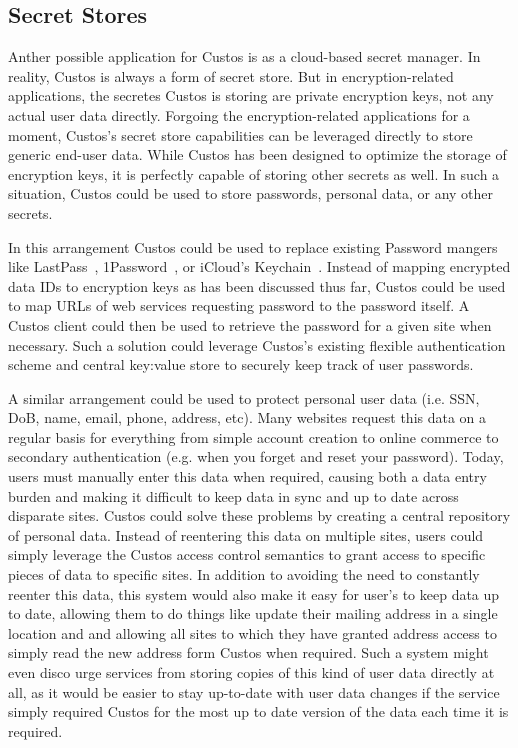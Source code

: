 \subsection{Secret Stores}

Anther possible application for Custos is as a cloud-based secret
manager. In reality, Custos is always a form of secret store. But in
encryption-related applications, the secretes Custos is storing are
private encryption keys, not any actual user data directly. Forgoing
the encryption-related applications for a moment, Custos's secret
store capabilities can be leveraged directly to store generic end-user
data. While Custos has been designed to optimize the storage of
encryption keys, it is perfectly capable of storing other secrets as
well. In such a situation, Custos could be used to store passwords,
personal data, or any other secrets.

In this arrangement Custos could be used to replace existing Password
mangers like LastPass~\cite{lastpass}, 1Password~\cite{onepassword},
or iCloud's Keychain~\cite{icloud}. Instead of mapping encrypted data
IDs to encryption keys as has been discussed thus far, Custos could be
used to map URLs of web services requesting password to the password
itself. A Custos client could then be used to retrieve the password
for a given site when necessary. Such a solution could leverage
Custos's existing flexible authentication scheme and central key:value
store to securely keep track of user passwords.

A similar arrangement could be used to protect personal user data
(i.e. SSN, DoB, name, email, phone, address, etc). Many websites
request this data on a regular basis for everything from simple
account creation to online commerce to secondary authentication
(e.g. when you forget and reset your password). Today, users must
manually enter this data when required, causing both a data entry
burden and making it difficult to keep data in sync and up to date
across disparate sites. Custos could solve these problems by creating
a central repository of personal data. Instead of reentering this data
on multiple sites, users could simply leverage the Custos access
control semantics to grant access to specific pieces of data to
specific sites. In addition to avoiding the need to constantly reenter
this data, this system would also make it easy for user's to keep data
up to date, allowing them to do things like update their mailing
address in a single location and and allowing all sites to which they
have granted address access to simply read the new address form Custos
when required. Such a system might even disco urge services from
storing copies of this kind of user data directly at all, as it would
be easier to stay up-to-date with user data changes if the service
simply required Custos for the most up to date version of the data
each time it is required.

